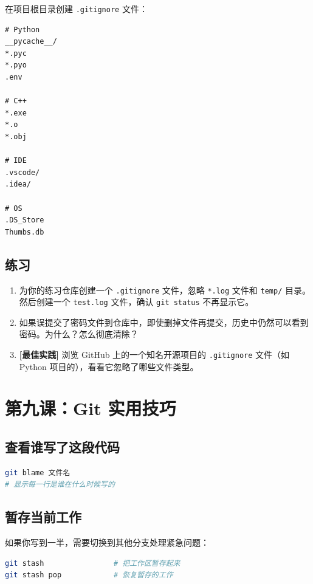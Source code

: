 \documentclass[a4paper,12pt]{ctexart}
\begin{document}
在项目根目录创建 \texttt{.gitignore} 文件：

\begin{lstlisting}
# Python
__pycache__/
*.pyc
*.pyo
.env

# C++
*.exe
*.o
*.obj

# IDE
.vscode/
.idea/

# OS
.DS_Store
Thumbs.db
\end{lstlisting}

\subsection*{练习}

\begin{enumerate}
  \item 为你的练习仓库创建一个 \texttt{.gitignore} 文件，忽略 \texttt{*.log} 文件和 \texttt{temp/} 目录。然后创建一个 \texttt{test.log} 文件，确认 \texttt{git status} 不再显示它。
  \item 如果误提交了密码文件到仓库中，即使删掉文件再提交，历史中仍然可以看到密码。为什么？怎么彻底清除？
  \item \textbf{[最佳实践]} 浏览 GitHub 上的一个知名开源项目的 \texttt{.gitignore} 文件（如 Python 项目的），看看它忽略了哪些文件类型。
\end{enumerate}

\section*{第九课：Git 实用技巧}

\subsection*{查看谁写了这段代码}

\begin{lstlisting}[language=bash]
git blame 文件名
# 显示每一行是谁在什么时候写的
\end{lstlisting}

\subsection*{暂存当前工作}

如果你写到一半，需要切换到其他分支处理紧急问题：

\begin{lstlisting}[language=bash]
git stash                # 把工作区暂存起来
git stash pop            # 恢复暂存的工作
\end{lstlisting}
\end{document}
